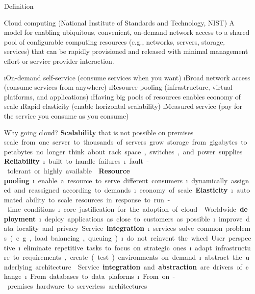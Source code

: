 \begin{frame}{Definition}
\begin{block}{Cloud computing (National Institute of Standards and Technology, NIST)}
A model for enabling ubiquitous, convenient, on-demand network access to a shared pool of configurable computing resources (e.g., networks, servers, storage, services) that can be rapidly provisioned and released with minimal management effort or service provider interaction. 
\end{block}

\i On-demand self-service (consume services when you want)
\i Broad network access (consume services from anywhere)
\i Resource pooling (infrastructure, virtual platforms, and applications)
\i Having big pools of resources enables economy of scale
\i Rapid elasticity (enable horizontal scalability)
\i Measured service (pay for the service you consume as you consume)
\end{frame}

\begin{frame}[allowframebreaks]{Why going cloud?}
\textbf{Scalability} that is not possible on premises
\si scale from one server to thousands
of servers
\si grow storage from gigabytes to petabytes
\si no longer think about rack space, switches, and power supplies

\textbf{Reliability} 
\i built to handle failures
\i fault-tolerant or highly available

\framebreak

\textbf{Resource pooling}
\i enable a resource to serve different consumers
\i dynamically assigned and reassigned according to demands
\i economy of scale

\textbf{Elasticity}
\i automated ability to scale resources in response to run-time conditions
\i core justification for the adoption of cloud

\framebreak

Worldwide \textbf{deployment}
\i deploy applications as close to customers as possible
\i improve data locality and privacy

Service \textbf{integration}
\i services solve common problems (e.g., load balancing, queuing)
\i do not reinvent the wheel

User perspective
\i eliminate repetitive tasks to focus on strategic ones
\i adapt infrastructure to requirements, create (test) environments on demand
\i abstract the underlying architecture

\framebreak

Service \textbf{integration} and \textbf{abstraction} are drivers of change
\i From databases to data plaforms
\i From on-premises hardware to serverless architectures

\end{frame}

